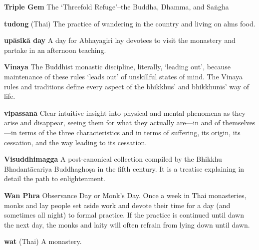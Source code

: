 \textbf{Triple Gem} The `Threefold Refuge'–the Buddha, Dhamma, and 
Saṅgha

\textbf{tudong} (Thai) The practice of wandering in the country and 
living on alms food.

\textbf{upāsikā day} A day for Abhayagiri lay devotees to visit the 
monastery and partake in an afternoon teaching.

\textbf{Vinaya} The Buddhist monastic discipline, literally, `leading 
out', because maintenance of these rules `leads out' of unskillful 
states of mind. The Vinaya rules and traditions define every aspect of 
the bhikkhus' and bhikkhunīs' way of life.

\textbf{vipassanā} Clear intuitive insight into physical and mental 
phenomena as they arise and disappear, seeing them for what they 
actually are---in and of themselves---in terms of the three 
characteristics and in terms of suffering, its origin, its cessation, 
and the way leading to its cessation.

\textbf{Visuddhimagga} A post-canonical collection compiled by the 
Bhikkhu Bhadantācariya Buddhaghoṣa in the fifth century. It is a 
treatise explaining in detail the path to enlightenment.

\textbf{Wan Phra} Observance Day or Monk's Day. Once a week in Thai 
monasteries, monks and lay people set aside work and devote their time 
for a day (and sometimes all night) to formal practice. If the practice 
is continued until dawn the next day, the monks and laity will often 
refrain from lying down until dawn.

\textbf{wat} (Thai) A monastery.


